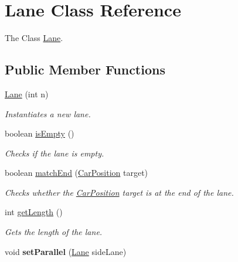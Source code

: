 \hypertarget{class_lane}{\section{Lane Class Reference}
\label{class_lane}
}


The Class \hyperlink{class_lane}{Lane}.  


\subsection*{Public Member Functions}
\begin{DoxyCompactItemize}
\item 
\hyperlink{class_lane_a636f1d6ef695cd3ac642096c051b3d6d}{Lane} (int n)
\begin{DoxyCompactList}\small\item\em Instantiates a new lane. \end{DoxyCompactList}\item 
boolean \hyperlink{class_lane_a7a6879f035bd1fa89328914f11028ff1}{is\+Empty} ()
\begin{DoxyCompactList}\small\item\em Checks if the lane is empty. \end{DoxyCompactList}\item 
boolean \hyperlink{class_lane_a461bba912631945e1b9abceb677729a5}{match\+End} (\hyperlink{class_car_position}{Car\+Position} target)
\begin{DoxyCompactList}\small\item\em Checks whether the \hyperlink{class_car_position}{Car\+Position} target is at the end of the lane. \end{DoxyCompactList}\item 
int \hyperlink{class_lane_afc04264fa269d5be97b570890907915a}{get\+Length} ()
\begin{DoxyCompactList}\small\item\em Gets the length of the lane. \end{DoxyCompactList}\item 
\hypertarget{class_lane_a97a49d217a4db63448439a4cb013e5ca}{void {\bfseries set\+Parallel} (\hyperlink{class_lane}{Lane} side\+Lane)}\label{class_lane_a97a49d217a4db63448439a4cb013e5ca}


\end{DoxyCompactItemize}
